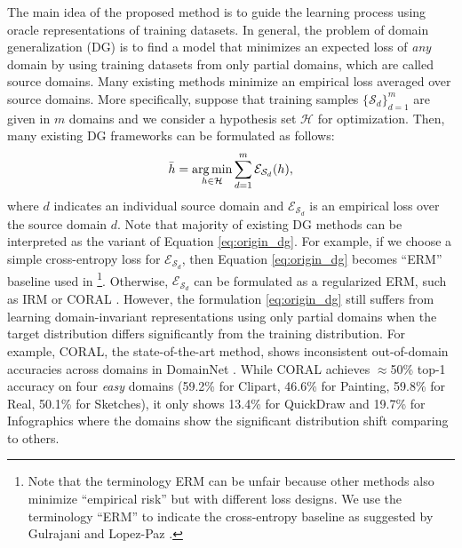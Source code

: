 The main idea of the proposed method is to guide the learning process using oracle representations of training datasets.
In general, the problem of domain generalization (DG) is to find a model that minimizes an expected loss of \emph{any} domain by using training datasets from only partial domains, which are called source domains.
Many existing methods minimize an empirical loss averaged over source domains.
More specifically, suppose that training samples $\{\mathcal{S}_{d}\}_{d=1}^{m}$ are given in $m$ domains and we consider a hypothesis set $\mathcal{H}$ for optimization.
Then, many existing DG frameworks can be formulated as follows:
\begin{align}\label{eq:origin_dg}
  \bar{h}=\operatorname*{arg\,min}_{h\in\mathcal{H}} \sum_{d=1}^{m} \mathcal E_{\mathcal{S}_{d}}(h),
\end{align}
where $d$ indicates an individual source domain and $\mathcal E_{\mathcal{S}_{d}}$ is an empirical loss over the source domain $d$.
Note that majority of existing DG methods can be interpreted as the variant of Equation \eqref{eq:origin_dg}.
For example, if we choose a simple cross-entropy loss for $\mathcal E_{\mathcal{S}_{d}}$, then Equation \eqref{eq:origin_dg} becomes ``ERM'' baseline used in \cite{gulrajani2020domainbed}\footnote{Note that the terminology ERM can be unfair because other methods also minimize ``empirical risk'' but with different loss designs. We use the terminology ``ERM'' to indicate the cross-entropy baseline as suggested by Gulrajani and Lopez-Paz \cite{gulrajani2020domainbed}.}. Otherwise, $\mathcal E_{\mathcal{S}_{d}}$ can be formulated as a regularized ERM, such as IRM \cite{arjovsky2019irm} or CORAL \cite{sun2016coral}.
However, the formulation \eqref{eq:origin_dg} still suffers from learning domain-invariant representations using only partial domains when the target distribution differs significantly from the training distribution. For example, CORAL, the state-of-the-art method, shows inconsistent out-of-domain accuracies across domains in DomainNet \cite{peng2019domainnet}. While CORAL achieves $\approx$50\% top-1 accuracy on four \emph{easy} domains (59.2\% for Clipart, 46.6\% for Painting, 59.8\% for Real, 50.1\% for Sketches), it only shows 13.4\% for QuickDraw and 19.7\% for Infographics where the domains show the significant distribution shift comparing to others.

